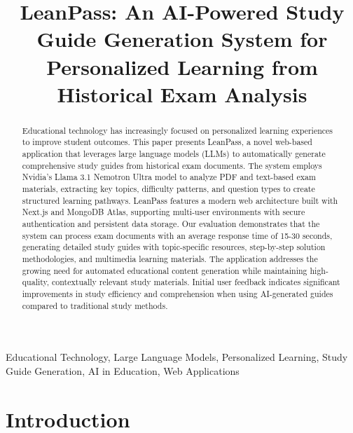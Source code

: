 \documentclass[conference]{IEEEtran}
\begin{document}
\title{LeanPass: An AI-Powered Study Guide Generation System for Personalized Learning from Historical Exam Analysis}

\author{
}

\maketitle

\begin{abstract}
Educational technology has increasingly focused on personalized learning experiences to improve student outcomes. This paper presents LeanPass, a novel web-based application that leverages large language models (LLMs) to automatically generate comprehensive study guides from historical exam documents. The system employs Nvidia's Llama 3.1 Nemotron Ultra model to analyze PDF and text-based exam materials, extracting key topics, difficulty patterns, and question types to create structured learning pathways. LeanPass features a modern web architecture built with Next.js and MongoDB Atlas, supporting multi-user environments with secure authentication and persistent data storage. Our evaluation demonstrates that the system can process exam documents with an average response time of 15-30 seconds, generating detailed study guides with topic-specific resources, step-by-step solution methodologies, and multimedia learning materials. The application addresses the growing need for automated educational content generation while maintaining high-quality, contextually relevant study materials. Initial user feedback indicates significant improvements in study efficiency and comprehension when using AI-generated guides compared to traditional study methods.
\end{abstract}

\begin{IEEEkeywords}
Educational Technology, Large Language Models, Personalized Learning, Study Guide Generation, AI in Education, Web Applications
\end{IEEEkeywords}

\section{Introduction}
\end{document}
